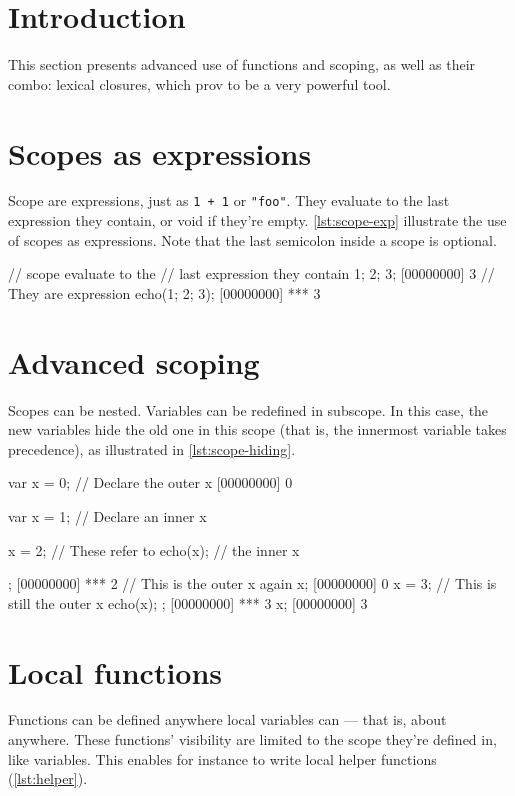 \documentclass[openright,twoside,12pt]{report}
\begin{document}
\section{Introduction}

This section presents advanced use of functions and scoping, as well
as their combo: lexical closures, which prov to be a very powerful
tool.

\section{Scopes as expressions}

Scope are expressions, just as \lstinline|1 + 1| or \lstinline|"foo"|.
They evaluate to the last expression they contain, or void if they're
empty. \autoref{lst:scope-exp} illustrate the use of scopes as
expressions. Note that the last semicolon inside a scope is optional.

\begin{urbiscript}[caption=Using scope as expressions,label=lst:scope-exp]
// scope evaluate to the
// last expression they contain
{ 1; 2; 3};
[00000000] 3
// They are expression
echo({1; 2; 3});
[00000000] *** 3
\end{urbiscript}

\section{Advanced scoping}

Scopes can be nested. Variables can be redefined in subscope. In this
case, the new variables hide the old one in this scope (that is, the
innermost variable takes precedence), as illustrated in
\autoref{lst:scope-hiding}.

\begin{urbiscript}[caption=Redefining variables in
  subscopes,label=lst:scope-hiding]
var x = 0; // Declare the outer x
[00000000] 0
{
  var x = 1; // Declare an inner x

  x = 2;    // These refer to
  echo(x);  // the inner x
};
[00000000] *** 2
// This is the outer x again
x;
[00000000] 0
{
  x = 3; // This is still the outer x
  echo(x);
};
[00000000] *** 3
x;
[00000000] 3
\end{urbiscript}

\section{Local functions}

Functions can be defined anywhere local variables can --- that is,
about anywhere. These functions' visibility are limited to the scope
they're defined in, like variables. This enables for instance to write
local helper functions (\autoref{lst:helper}).
\end{document}
